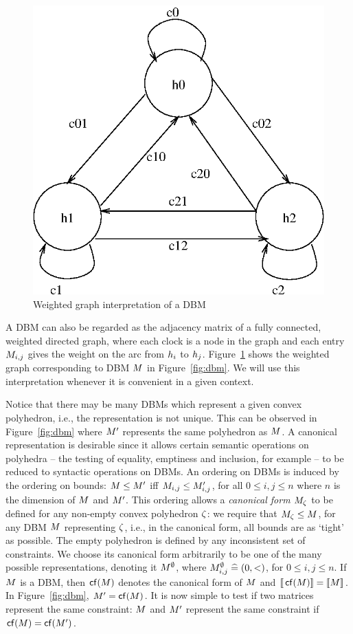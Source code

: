 {\begin{figure}
\begin{center}
\includegraphics[width=.45\linewidth]{METHODS/dbmgraph.eps}
\end{center}
\caption{Weighted graph interpretation of a DBM\label{fig:dbmgraph}}
\end{figure}

A DBM can also be regarded as the adjacency matrix of a fully
connected, weighted directed graph, where each clock is a node in the
graph and each entry ${M}_{i,j}$ gives the weight on the arc from
$h_i$ to $h_j$. Figure~\ref{fig:dbmgraph} shows the weighted
graph corresponding to DBM ${M}$ in Figure~\ref{fig:dbm}.  We will use
this interpretation whenever it is convenient in a given context.

Notice that there may be many DBMs which represent a given convex
polyhedron, i.e., the representation is not unique. This can be
observed in Figure~\ref{fig:dbm} where ${M}'$ represents the same
polyhedron as ${M}$. A canonical representation is desirable since it
allows certain semantic operations on polyhedra -- the testing of
equality, emptiness and inclusion, for example -- to be reduced to syntactic
operations on DBMs. An ordering on DBMs is induced by the ordering on
bounds: ${M} \leq {M}'$ iff ${M}_{i,j} \leq M'_{i,j}$, for all $0 \leq
i,j \leq n$ where $n$ is the dimension of ${M}$ and ${M}'$. This
ordering allows a \emph{canonical form} ${M}_{\zeta}$ to be defined
for any non-empty convex polyhedron ${\zeta}$: we require that
${M}_{\zeta} \leq {M}$, for any DBM ${M}$ representing ${\zeta}$,
i.e., in the canonical form, all bounds are as `tight' as possible.  The
empty polyhedron is defined by any inconsistent set of constraints. We
choose its canonical form arbitrarily to be one of the many possible
representations, denoting it ${M}^\emptyset$, where ${M}^\emptyset_{i,j}
\mathrel{\widehat=} (0,<)$, for $0 \leq i,j \leq n$. If ${M}$ is a DBM, then $\mathop{\sf cf}({M})$ 
denotes the canonical form of ${M}$ and ${\lbrack\!\lbrack}\mathop{\sf cf}({M}){\rbrack\!\rbrack} = {\lbrack\!\lbrack}{M}{\rbrack\!\rbrack}$.
In Figure~\ref{fig:dbm}, ${M}' = \mathop{\sf cf}({M})$.
It is now simple to test if two matrices represent the same constraint:
${M}$ and ${M}'$ represent the same constraint if $\mathop{\sf cf}({M}) = \mathop{\sf cf}({M}')$.

}
